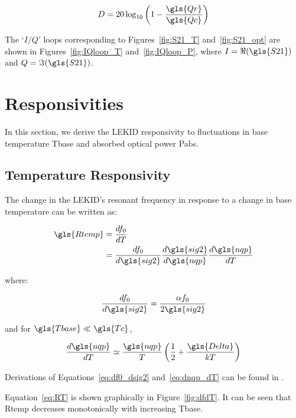 \begin{equation}\label{eq:dip_depth}
  D = 20\log_{10}\left( 1 - \frac{\gls{Qr}}{\gls{Qc}}\right)
\end{equation}

The `$I/Q$' loops corresponding to Figures~\ref{fig:S21_T} and~\ref{fig:S21_opt} are shown in Figures~\ref{fig:IQloop_T} and~\ref{fig:IQloop_P}, where $I = \Re(\gls{S21})$ and $Q = \Im(\gls{S21})$.

\section{Responsivities}\label{sec:responsivity}

In this section, we derive the LEKID responsivity to fluctuations in base temperature \gls{Tbase} and absorbed optical power \gls{Pabs}.

\subsection{Temperature Responsivity}

The change in the LEKID's resonant frequency in response to a change in base temperature can be written as:

\begin{equation}\label{eq:RT}
  \begin{aligned}
  \gls{Rtemp} &= \frac{df_{0}}{dT} \\
              &= \frac{df_{0}}{d\gls{sig2}} \frac{d\gls{sig2}}{d\gls{nqp}} \frac{d\gls{nqp}}{dT}
  \end{aligned}
\end{equation}

where:

\begin{equation}\label{eq:df0_dsig2}
  \frac{df_{0}}{d\gls{sig2}} = \frac{\alpha f_{0}}{2\gls{sig2}}
\end{equation}

and for $\gls{Tbase} \ll \gls{Tc}$,

\begin{equation}\label{eq:dnqp_dT}
  \frac{d\gls{nqp}}{dT} \simeq \frac{\gls{nqp}}{T} \left(\frac{1}{2} + \frac{\gls{Delta}}{kT} \right)
\end{equation}

Derivations of Equations~\ref{eq:df0_dsig2} and~\ref{eq:dnqp_dT} can be found in \citet{mauskopf2018transition}.

Equation~\ref{eq:RT} is shown graphically in Figure~\ref{fig:dfdT}. It can be seen that \gls{Rtemp} decreases monotonically with increasing \gls{Tbase}.

